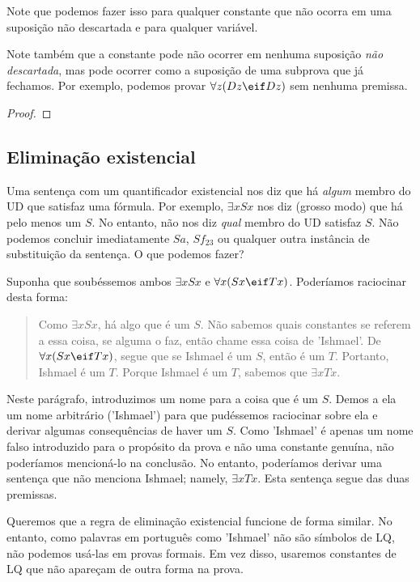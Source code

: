 Note que podemos fazer isso para qualquer constante que não ocorra em uma suposição não descartada e para qualquer variável.

Note também que a constante pode não ocorrer em nenhuma suposição \emph{não descartada}, mas pode ocorrer como a suposição de uma subprova que já fechamos. Por exemplo, podemos provar $\forall z(Dz \eif Dz)$ sem nenhuma premissa.

\begin{proof}
	\open
	\close
\end{proof}


\subsection{Eliminação existencial}
Uma sentença com um quantificador existencial nos diz que há \emph{algum} membro do UD que satisfaz uma fórmula. Por exemplo, $\exists x Sx$ nos diz (grosso modo) que há pelo menos um $S$. No entanto, não nos diz \emph{qual} membro do UD satisfaz $S$. Não podemos concluir imediatamente $Sa$, $Sf_{23}$ ou qualquer outra instância de substituição da sentença. O que podemos fazer?

Suponha que soubéssemos ambos $\exists x Sx$ e $\forall x(Sx \eif Tx)$. Poderíamos raciocinar desta forma:
\begin{quote}
Como $\exists x Sx$, há algo que é um $S$. Não sabemos quais constantes se referem a essa coisa, se alguma o faz, então chame essa coisa de 'Ishmael'. De $\forall x(Sx \eif Tx)$, segue que se Ishmael é um $S$, então é um $T$. Portanto, Ishmael é um $T$.  Porque Ishmael é um $T$, sabemos que $\exists x Tx$.
\end{quote}
Neste parágrafo, introduzimos um nome para a coisa que é um $S$. Demos a ela um nome arbitrário ('Ishmael') para que pudéssemos raciocinar sobre ela e derivar algumas consequências de haver um $S$. Como 'Ishmael' é apenas um nome falso introduzido para o propósito da prova e não uma constante genuína, não poderíamos mencioná-lo na conclusão. No entanto, poderíamos derivar uma sentença que não menciona Ishmael; namely, $\exists x Tx$. Esta sentença segue das duas premissas.

Queremos que a regra de eliminação existencial funcione de forma similar. No entanto, como palavras em português como 'Ishmael' não são símbolos de LQ, não podemos usá-las em provas formais. Em vez disso, usaremos constantes de LQ que não apareçam de outra forma na prova.

